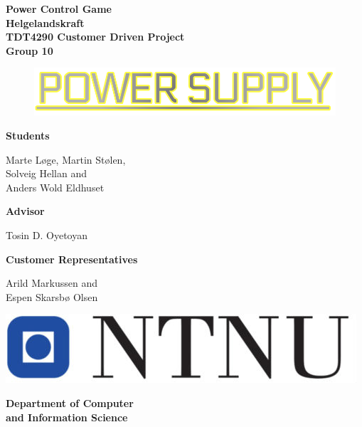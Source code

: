\begin{titlepage}
\begin{center}

{\Huge \bf Power Control Game} \\[1.0cm]
{\Huge \bf Helgelandskraft} \\[1.0cm]
{\Large \bf TDT4290 Customer Driven Project} \\[1.0cm]
{\Large \bf Group 10}\\[1.0cm]
\vspace{1cm}

\begin{figure}[!ht]
	\centering
	\includegraphics[scale=0.45]{pictures/newLogo.png}
\end{figure}
\vspace{1cm}


{\bf Students}

{Marte Løge, Martin Stølen, \\
Solveig Hellan and \\
Anders Wold Eldhuset}

{\bf Advisor}

Tosin D. Oyetoyan

{\bf Customer Representatives}

Arild Markussen and \\
Espen Skarsbø Olsen

\vspace{2cm}

\includegraphics[scale=0.2]{pictures/ntnu.jpg}

{\bf Department of Computer \\and Information Science}


\end{center}
\end{titlepage}